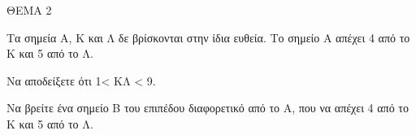 
ΘΕΜΑ 2

Τα σημεία Α, Κ και Λ δε βρίσκονται στην ίδια ευθεία. Το σημείο Α απέχει 4 από το Κ και 5 από το Λ.

\begin{alist}
\item Να αποδείξετε ότι 1\textless{} ΚΛ \textless{} 9. 

\item Να βρείτε ένα σημείο Β του επιπέδου διαφορετικό από το Α, που να απέχει 4 από το Κ και 5 από το Λ. 


\end{alist}
